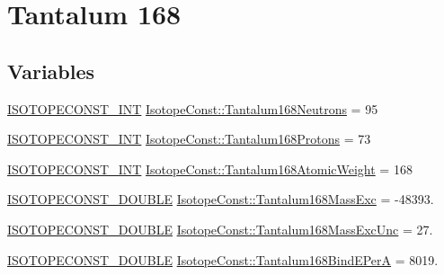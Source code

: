 \hypertarget{group___isotope_const-_tantalum-_ta168}{}\section{Tantalum 168}
\label{group___isotope_const-_tantalum-_ta168}
\subsection*{Variables}
\begin{DoxyCompactItemize}
\item 
\mbox{\hyperlink{group___isotope_const-_macros_ga5f18360b3e99483a35c32d789e62621c}{I\+S\+O\+T\+O\+P\+E\+C\+O\+N\+S\+T\+\_\+\+I\+NT}} \mbox{\hyperlink{group___isotope_const-_tantalum-_ta168_gaf558884f2f598b320e50a37a79b6aca3}{Isotope\+Const\+::\+Tantalum168\+Neutrons}} = 95
\item 
\mbox{\hyperlink{group___isotope_const-_macros_ga5f18360b3e99483a35c32d789e62621c}{I\+S\+O\+T\+O\+P\+E\+C\+O\+N\+S\+T\+\_\+\+I\+NT}} \mbox{\hyperlink{group___isotope_const-_tantalum-_ta168_ga2e843164ac4b4289cc676ac64ec1335c}{Isotope\+Const\+::\+Tantalum168\+Protons}} = 73
\item 
\mbox{\hyperlink{group___isotope_const-_macros_ga5f18360b3e99483a35c32d789e62621c}{I\+S\+O\+T\+O\+P\+E\+C\+O\+N\+S\+T\+\_\+\+I\+NT}} \mbox{\hyperlink{group___isotope_const-_tantalum-_ta168_gad2ce11cc8b168ad7ba2c19510e682b47}{Isotope\+Const\+::\+Tantalum168\+Atomic\+Weight}} = 168
\item 
\mbox{\hyperlink{group___isotope_const-_macros_ga8f45a7272ce02c0b4c65c44636ed719a}{I\+S\+O\+T\+O\+P\+E\+C\+O\+N\+S\+T\+\_\+\+D\+O\+U\+B\+LE}} \mbox{\hyperlink{group___isotope_const-_tantalum-_ta168_ga5b59666d82cfbc1f79fcc8da48f11fa7}{Isotope\+Const\+::\+Tantalum168\+Mass\+Exc}} = -\/48393.
\item 
\mbox{\hyperlink{group___isotope_const-_macros_ga8f45a7272ce02c0b4c65c44636ed719a}{I\+S\+O\+T\+O\+P\+E\+C\+O\+N\+S\+T\+\_\+\+D\+O\+U\+B\+LE}} \mbox{\hyperlink{group___isotope_const-_tantalum-_ta168_ga109981aa9dc1b092afa7db23e93d3cc5}{Isotope\+Const\+::\+Tantalum168\+Mass\+Exc\+Unc}} = 27.
\item 
\mbox{\hyperlink{group___isotope_const-_macros_ga8f45a7272ce02c0b4c65c44636ed719a}{I\+S\+O\+T\+O\+P\+E\+C\+O\+N\+S\+T\+\_\+\+D\+O\+U\+B\+LE}} \mbox{\hyperlink{group___isotope_const-_tantalum-_ta168_ga86605a44f488aa4fe93f2c07c52c0059}{Isotope\+Const\+::\+Tantalum168\+Bind\+E\+PerA}} = 8019.
\item 

\end{DoxyCompactItemize}
